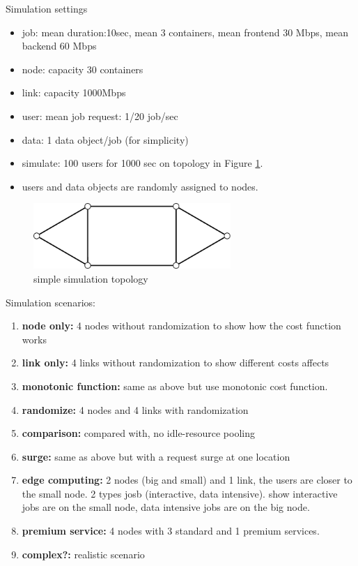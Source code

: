 
Simulation settings
\begin{itemize}
  \item		job: mean duration:10sec, mean 3 containers,
        mean frontend 30 Mbps, mean backend 60 Mbps
  \item		node: capacity 30 containers
  \item		link: capacity 1000Mbps
  \item		user: mean job request: 1/20 job/sec
  \item		data: 1 data object/job (for simplicity)
  \item		simulate: 100 users for 1000 sec on topology in Figure \ref{fig:topology-simple}.
  \item		users and data objects are randomly assigned to nodes.
\end{itemize}

\begin{figure}[htb]
  \begin{center}
    \includegraphics[width=7.5cm,clip]{topology-simple.pdf}
    \vspace{-2.0ex}
    \caption{simple simulation topology}
    \label{fig:topology-simple}
  \end{center}
\end{figure}

Simulation scenarios:

\begin{enumerate}
  \item	{\bf node only:} 4 nodes without randomization to show how the
        cost function works
  \item	{\bf link only:} 4 links without randomization to show
        different costs affects
  \item	{\bf monotonic function:} same as above but use monotonic cost
        function.
  \item	{\bf randomize:} 4 nodes and 4 links with randomization
  \item {\bf comparison:} compared with, no idle-resource pooling
  \item	{\bf surge:} same as above but with a request surge at one location
  \item	{\bf edge computing:} 2 nodes (big and small) and 1 link, the
    users are closer to the small node. 2 types josb (interactive,
    data intensive).  show interactive jobs are on the small node,
    data intensive jobs are on the big node.
  \item {\bf premium service:} 4 nodes with 3 standard and 1 premium services.
  \item	{\bf complex?:} realistic scenario
\end{enumerate}
